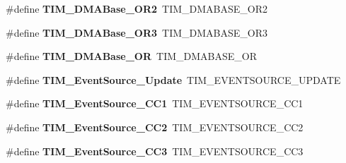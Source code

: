 \begin{DoxyCompactItemize}
\item 
\#define {\bfseries T\+I\+M\+\_\+\+D\+M\+A\+Base\+\_\+\+O\+R2}~T\+I\+M\+\_\+\+D\+M\+A\+B\+A\+S\+E\+\_\+\+O\+R2\hypertarget{group___h_a_l___t_i_m___aliased___defines_ga2a1e120dc725fd26c37c29cf97fdcaa9}{}\label{group___h_a_l___t_i_m___aliased___defines_ga2a1e120dc725fd26c37c29cf97fdcaa9}

\item 
\#define {\bfseries T\+I\+M\+\_\+\+D\+M\+A\+Base\+\_\+\+O\+R3}~T\+I\+M\+\_\+\+D\+M\+A\+B\+A\+S\+E\+\_\+\+O\+R3\hypertarget{group___h_a_l___t_i_m___aliased___defines_gae675fedf9cf67bd86a36f17d37f99106}{}\label{group___h_a_l___t_i_m___aliased___defines_gae675fedf9cf67bd86a36f17d37f99106}

\item 
\#define {\bfseries T\+I\+M\+\_\+\+D\+M\+A\+Base\+\_\+\+OR}~T\+I\+M\+\_\+\+D\+M\+A\+B\+A\+S\+E\+\_\+\+OR\hypertarget{group___h_a_l___t_i_m___aliased___defines_gad6a75d19df73bae091a0e649fba7339c}{}\label{group___h_a_l___t_i_m___aliased___defines_gad6a75d19df73bae091a0e649fba7339c}

\item 
\#define {\bfseries T\+I\+M\+\_\+\+Event\+Source\+\_\+\+Update}~T\+I\+M\+\_\+\+E\+V\+E\+N\+T\+S\+O\+U\+R\+C\+E\+\_\+\+U\+P\+D\+A\+TE\hypertarget{group___h_a_l___t_i_m___aliased___defines_ga5bff72fbe94b1ae5a710e402c9868b23}{}\label{group___h_a_l___t_i_m___aliased___defines_ga5bff72fbe94b1ae5a710e402c9868b23}

\item 
\#define {\bfseries T\+I\+M\+\_\+\+Event\+Source\+\_\+\+C\+C1}~T\+I\+M\+\_\+\+E\+V\+E\+N\+T\+S\+O\+U\+R\+C\+E\+\_\+\+C\+C1\hypertarget{group___h_a_l___t_i_m___aliased___defines_gaa634c46d4ac521ad16e25be97b487e8a}{}\label{group___h_a_l___t_i_m___aliased___defines_gaa634c46d4ac521ad16e25be97b487e8a}

\item 
\#define {\bfseries T\+I\+M\+\_\+\+Event\+Source\+\_\+\+C\+C2}~T\+I\+M\+\_\+\+E\+V\+E\+N\+T\+S\+O\+U\+R\+C\+E\+\_\+\+C\+C2\hypertarget{group___h_a_l___t_i_m___aliased___defines_ga5e2082a09552acc9c7e9577f104ba15a}{}\label{group___h_a_l___t_i_m___aliased___defines_ga5e2082a09552acc9c7e9577f104ba15a}

\item 
\#define {\bfseries T\+I\+M\+\_\+\+Event\+Source\+\_\+\+C\+C3}~T\+I\+M\+\_\+\+E\+V\+E\+N\+T\+S\+O\+U\+R\+C\+E\+\_\+\+C\+C3\hypertarget{group___h_a_l___t_i_m___aliased___defines_gafeb8538e3b00d938e061e5051f83836b}{}\label{group___h_a_l___t_i_m___aliased___defines_gafeb8538e3b00d938e061e5051f83836b}


\end{DoxyCompactItemize}
